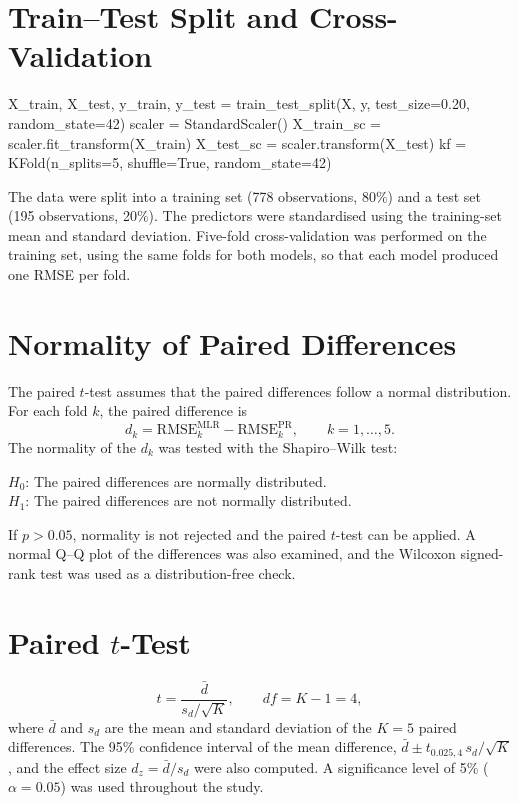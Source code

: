 \documentclass[12pt,a4paper]{report}
\begin{document}
\section{Train--Test Split and Cross-Validation}
\begin{code}
X_train, X_test, y_train, y_test = train_test_split(X, y, test_size=0.20, random_state=42)
scaler = StandardScaler()
X_train_sc = scaler.fit_transform(X_train)
X_test_sc = scaler.transform(X_test)
kf = KFold(n_splits=5, shuffle=True, random_state=42)
\end{code}
The data were split into a training set (778 observations, 80\%) and a test set (195 observations, 20\%). The predictors were standardised using the training-set mean and standard deviation. Five-fold cross-validation was performed on the training set, using the same folds for both models, so that each model produced one RMSE per fold.

\section{Normality of Paired Differences}
The paired $t$-test assumes that the paired differences follow a normal distribution. For each fold $k$, the paired difference is
\[ d_k = \text{RMSE}_k^{\text{MLR}} - \text{RMSE}_k^{\text{PR}}, \qquad k = 1,\dots,5. \]
The normality of the $d_k$ was tested with the Shapiro--Wilk test:

\noindent $H_0$: The paired differences are normally distributed.\\
$H_1$: The paired differences are not normally distributed.

\noindent If $p > 0.05$, normality is not rejected and the paired $t$-test can be applied. A normal Q--Q plot of the differences was also examined, and the Wilcoxon signed-rank test was used as a distribution-free check.

\section{Paired $t$-Test}
\[ t = \frac{\bar d}{s_d/\sqrt{K}}, \qquad df = K - 1 = 4, \]
where $\bar d$ and $s_d$ are the mean and standard deviation of the $K = 5$ paired differences. The 95\% confidence interval of the mean difference, $\bar d \pm t_{0.025,4}\, s_d/\sqrt{K}$, and the effect size $d_z = \bar d/s_d$ were also computed. A significance level of 5\% ($\alpha = 0.05$) was used throughout the study.

\end{document}

